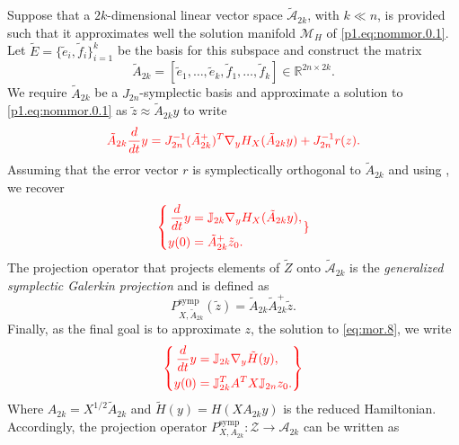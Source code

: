 Suppose that a $2k$-dimensional linear vector space $\tilde{ \mathcal A}_{2k}$, with $k\ll n$, is provided such that it approximates well the solution manifold $\mathcal M_H$ of \eqref{p1.eq:nommor.0.1}. Let $\tilde E = \{ \tilde e_i,\tilde f_i \}_{i=1}^k$ be the basis for this subspace and construct the matrix
\begin{equation} \label{p1.eq:nommor.0.7}
	\tilde A_{2k} = [\tilde e_1,\dots,\tilde e_k,\tilde f_1,\dots,\tilde f_k] \in \mathbb R^{2n\times 2k}.
\end{equation}
We require $\tilde A_{2k}$ be a $J_{2n}$-symplectic basis and approximate a solution to \eqref{p1.eq:nommor.0.1} as $\tilde z \approx \tilde A_{2k} y$ to write
\begin{equation} \label{p1.eq:nommor.0.8}
	\edit{ \tilde A_{2k} \frac d {dt} y = J^{-1}_{2n} (\tilde A_{2k}^+)^T \nabla_{y} H_X(\tilde A_{2k}y) + J^{-1}_{2n} r(z).}
\end{equation}
Assuming that the error vector $r$ is symplectically orthogonal to $\tilde A_{2k}$ and using , we recover
\begin{equation}
	{\color{red}  \left\{
	\begin{aligned}
		\frac d {dt} y &= \mathbb J_{2k} \nabla_{y} H_X(\tilde A_{2k} y), \\
		y(0) &= \tilde A_{2k}^+ \tilde z_0.
	\end{aligned}
	\right.	\}}
\end{equation}
The projection operator that projects elements of $\tilde Z$ onto $\tilde {\mathcal A}_{2k}$ is the \emph{generalized symplectic Galerkin projection} and is defined as
\begin{equation} \label{p1.eq:nommor.0.9}
	P_{X,\tilde A_{2k}}^{\text{symp}}(\tilde z) = \tilde A_{2k} \tilde A_{2k}^+ \tilde z.
\end{equation}
Finally, as the final goal is to approximate $z$, the solution to \eqref{eq:mor.8}, we write
\begin{equation} \label{p1.eq:nommor.0.10}
	\edit{ \left\{
	\begin{aligned}
		\frac{d}{dt} y &= \mathbb J_{2k} \nabla_y \tilde H(y), \\
		y(0) &= \mathbb J_{2k}^T A^T X \mathbb J_{2n} z_0.
	\end{aligned}
	\right\}}
\end{equation}
Where $A_{2k} = X^{1/2} \tilde A_{2k}$ and $\tilde H(y) = H(XA_{2k}y)$ is the reduced Hamiltonian. Accordingly, the projection operator $P_{X,A_{2k}}^\text{symp}:\mathcal Z\to \mathcal A_{2k}$ can be written as
